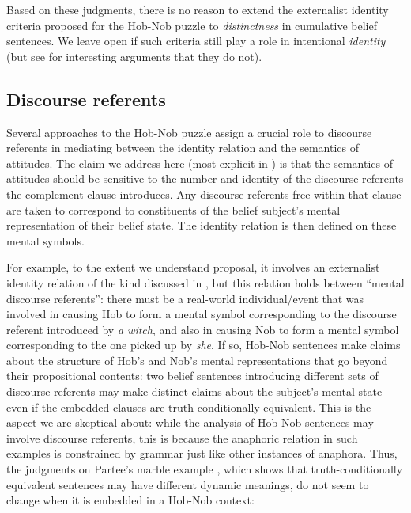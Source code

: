 \documentclass[output=paper]{langscibook}
\begin{document}
\noindent Based on these judgments, there is no reason to extend the externalist identity criteria proposed for the Hob-Nob puzzle to \textit{distinctness} in cumulative belief sentences. We leave open if such criteria still play a role in intentional \textit{identity} (but see \citealt{Edelberg:1992} for interesting arguments that they do not).

\subsection{Discourse referents}\label{sch-has:sec:4.2}

Several approaches to the Hob-Nob puzzle \citep{Dekker:1998,Cumming:2007} assign a crucial role to discourse referents in mediating between the identity relation and the semantics of attitudes. The claim we address here (most explicit in \citealt{Cumming:2007}) is that the semantics of attitudes should be sensitive to the number and identity of the discourse referents the complement clause introduces. Any discourse referents free within that clause are taken to correspond to constituents of the belief subject's mental representation of their belief state. The identity relation is then defined on these mental symbols.

For example, to the extent we understand  proposal, it involves an externalist identity relation of the kind discussed in , but this relation holds between ``mental discourse referents'': there must be a real-world individual/event that was involved in causing Hob to form a mental symbol corresponding to the discourse referent introduced by \textit{a witch}, and also in causing Nob to form a mental symbol corresponding to the one picked up by \textit{she}. If so, Hob-Nob sentences make claims about the structure of Hob's and Nob's mental representations that go beyond their propositional contents: two belief sentences introducing different sets of discourse referents may make distinct claims about the subject's mental state even if the embedded clauses are truth-conditionally equivalent. This is the aspect we are skeptical about: while the analysis of Hob-Nob sentences may involve discourse referents, this is because the anaphoric relation in such examples is constrained by grammar just like other instances of anaphora. Thus, the judgments on Partee's marble example \citep{Heim:1982}, which shows that truth-conditionally equivalent sentences may have different dynamic meanings, do not seem to change when it is embedded in a Hob-Nob context:
\end{document}
